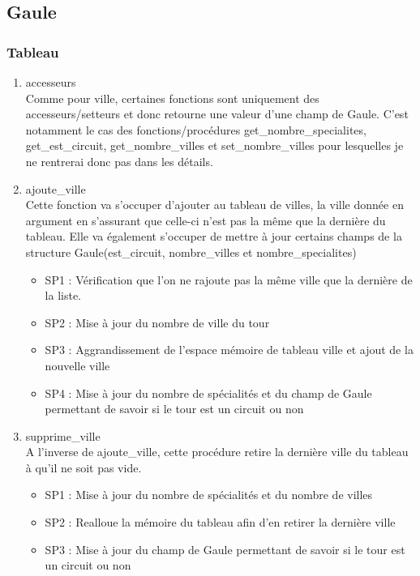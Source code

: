\documentclass[a4paper, 11pt, oneside]{article}
\begin{document}
\subsection{\textbf{Gaule}}
\subsubsection{Tableau}
\begin{enumerate}
    \item accesseurs
    \\Comme pour ville, certaines fonctions sont uniquement des accesseurs/setteurs 
    et donc retourne une valeur d'une champ de Gaule. C'est notamment le cas des 
    fonctions/procédures get\_nombre\_specialites, get\_est\_circuit, get\_nombre\_villes et
    set\_nombre\_villes pour lesquelles je ne rentrerai donc pas dans les détails. 
    \item ajoute\_ville
    \\Cette fonction va s'occuper d'ajouter au tableau de villes, la ville donnée en argument 
    en s'assurant que celle-ci n'est pas la même que la dernière du tableau. Elle va également 
    s'occuper de mettre à jour certains champs de la structure Gaule(est\_circuit, nombre\_villes et 
    nombre\_specialites)
    \begin{itemize}
        \item SP1 : Vérification que l'on ne rajoute pas la même ville que la dernière de la liste.
        \item SP2 : Mise à jour du nombre de ville du tour
        \item SP3 : Aggrandissement de l'espace mémoire de tableau ville et ajout de la nouvelle ville
        \item SP4 : Mise à jour du nombre de spécialités et du champ de Gaule permettant de savoir 
        si le tour est un circuit ou non
    \end{itemize}
    \item supprime\_ville
    \\A l'inverse de ajoute\_ville, cette procédure retire la dernière ville du tableau à
    qu'il ne soit pas vide.
    \begin{itemize}
        \item SP1 : Mise à jour du nombre de spécialités et du nombre de villes
        \item SP2 : Realloue la mémoire du tableau afin d'en retirer la dernière ville
        \item SP3 : Mise à jour du champ de Gaule permettant de savoir si le tour est un circuit ou non

\end{itemize}
\end{enumerate}
\end{document}
